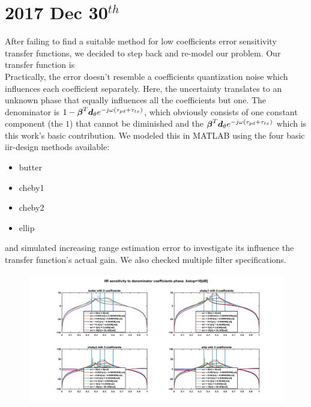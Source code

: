 \documentclass[12pt]{article}
\begin{document}
\section{2017 Dec 30$^{th}$}
After failing to find a suitable method for low coefficients error sensitivity transfer functions, we decided to step back and re-model our problem. Our transfer function is 
$$

$$
Practically, the error doesn't resemble a coefficients quantization noise which influences each coefficient separately. Here, the uncertainty translates to an unknown phase that equally influences all the coefficients but one. The denominator is $ 1 - \vecnot{\beta}^{T}\vecnot{d}_{\theta}e^{-j\omega (\tau_{pd}+\tau_{tx})} $, which obviously consists of one constant component (the $ 1 $) that cannot be diminished and the $ \vecnot{\beta}^{T}\vecnot{d}_{\theta}e^{-j\omega (\tau_{pd}+\tau_{tx})} $ which is this work's basic contribution. We modeled this in MATLAB using the four basic iir-design methods available:
\begin{itemize}
\item {butter}
\item {cheby1}
\item {cheby2}
\item {ellip}
\end{itemize}
and simulated increasing range estimation error to investigate its influence the transfer function's actual gain. We also checked multiple filter specifications.
\begin{figure}[!ht]
\begin{center}
\includegraphics[width=1\textwidth]{Media/filterSensitivitySim/filtSensitivity10dB.jpg}
\end{center}
\end{figure}
\end{document}
